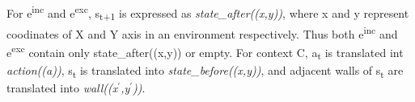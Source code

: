 For e\textsuperscript{inc} and e\textsuperscript{exc}, s\textsubscript{t+1} is expressed as \textit{state\_after((x,y))}, where x and y represent coodinates of X and Y axis in an environment respectively.
Thus both e\textsuperscript{inc} and e\textsuperscript{exc} contain only state\_after((x,y)) or empty.
For context C, a\textsubscript{t} is translated int \textit{action((a))}, s\textsubscript{t} is translated into \textit{state\_before((x,y))}, and adjacent walls of s\textsubscript{t} are translated into \textit{wall((x$^\prime$,y$^\prime$))}.



